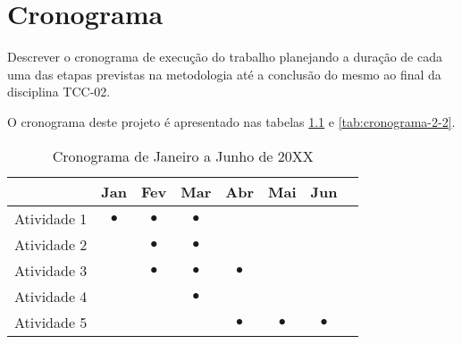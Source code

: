 \documentclass[font=plain]{abnt}
\begin{document}
\chapter{Cronograma}

Descrever o cronograma de execução do trabalho planejando a duração de cada uma das etapas previstas na metodologia até a conclusão do mesmo ao final da disciplina TCC-02.

O cronograma deste projeto é apresentado nas tabelas \ref{tab:cronograma-1-2} e \ref{tab:cronograma-2-2}.

\begin{table}[ht]
    \centering
    \begin{tabular}{ p{7.8cm} c c c c c c c }
        \toprule
         & Jan       & Fev       & Mar       & Abr       & Mai       & Jun       & \\
        \midrule
        Atividade 1
         & $\bullet$ & $\bullet$ & $\bullet$ &           &           &           & \\
        \midrule
        Atividade 2
         &           & $\bullet$ & $\bullet$ &           &           &           & \\
        \midrule
        Atividade 3
         &           & $\bullet$ & $\bullet$ & $\bullet$ &           &           & \\
        \midrule
        Atividade 4
         &           &           & $\bullet$ &           &           &           & \\
        \midrule
        Atividade 5
         &           &           &           & $\bullet$ & $\bullet$ & $\bullet$ & \\
        \bottomrule
    \end{tabular}
    \caption{Cronograma de Janeiro a Junho de 20XX}
    \label{tab:cronograma-1-2}
\end{table}
\end{document}
